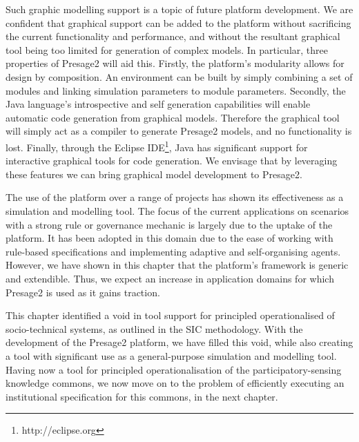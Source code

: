 Such graphic modelling support is a topic of future platform development. We are
confident that graphical support can be added to the platform without
sacrificing the current functionality and performance, and without the resultant
graphical tool being too limited for generation of complex models. In
particular, three properties of Presage2 will aid this. Firstly, the platform's
modularity allows for design by composition. An environment can be built by
simply combining a set of modules and linking simulation parameters to module
parameters. Secondly, the Java language's introspective and self generation
capabilities will enable automatic code generation from graphical models.
Therefore the graphical tool will simply act as a compiler to generate Presage2
models, and no functionality is lost. Finally, through the Eclipse IDE\footnote{
http://eclipse.org}, Java has significant support for interactive graphical
tools for code generation. We envisage that by leveraging these features we can
bring graphical model development to Presage2.

The use of the platform over a range of projects has shown its effectiveness
as a simulation and modelling tool. The focus of the current applications on
scenarios with a strong rule or governance mechanic is largely due to the
uptake of the platform. It has been adopted in this domain due to the ease of
working with rule-based specifications and implementing adaptive and 
self-organising agents. However, we have shown in this chapter that the platform's
framework is generic and extendible. Thus, we expect an increase in application
domains for which Presage2 is used as it gains traction.

This chapter identified a void in tool support for principled operationalised
of socio-technical systems, as outlined in the \ac{SIC} methodology. With the
development of the Presage2 platform, we have filled this void, while also
creating a tool with significant use as a general-purpose simulation and
modelling tool. Having now a tool for principled operationalisation of the
participatory-sensing knowledge commons, we now move on to the problem of
efficiently executing an institutional specification for this commons, in the
next chapter.

